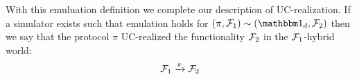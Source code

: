 With this emuluation definition we complete our description of UC-realization.
If a simulator exists such that emulation holds for $(\pi, \F_1) \sim (\idealP, \F_2)$ then we say that the protocol $\pi$ UC-realized the functionality $\mathcal{F}_2$ in the $\mathcal{F}_1$-hybrid world:
\[
	\mathcal{F}_1 \xrightarrow{\pi} \mathcal{F}_2
\]



%

